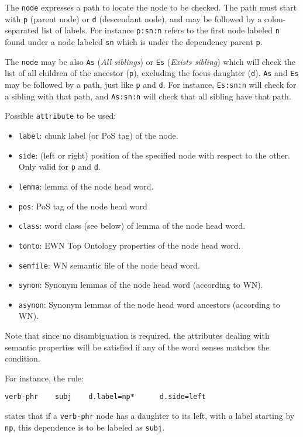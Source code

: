 \documentclass[a4paper]{book}
\begin{document}
   The \verb#node# expresses a path to locate the node to be
   checked. The path must start with \verb#p# (parent node) or
   \verb#d# (descendant node), and may be followed by a
   colon-separated list of labels. For instance \verb#p:sn:n# refers
   to the first node labeled \verb#n# found under a node labeled
   \verb#sn# which is under the dependency parent \verb#p#.

   The \verb#node# may be also \verb#As# ({\em All siblings}) or
   \verb#Es# ({\sl Exists sibling}) which will check the list of all
   children of the ancestor (\verb#p#), excluding the focus daughter
   (\verb#d#).  \verb#As# and \verb#Es# may be followed by a path,
   just like \verb#p# and \verb#d#. For instance, \verb#Es:sn:n# 
   will check for a sibling with that path, and  \verb#As:sn:n# 
   will check that all sibling have that path.
  
   Possible {\tt attribute} to be used:
  \begin{itemize}
    \item \verb#label#: chunk label (or PoS tag) of the node.
    \item \verb#side#: (left or right) position of the specified node with respect to the other.  Only valid for \verb#p# and \verb#d#.
    \item \verb#lemma#: lemma of the node head word.
    \item \verb#pos#: PoS tag of the node head word
    \item \verb#class#: word class (see below) of lemma of the node head word.
    \item \verb#tonto#: EWN Top Ontology properties of the node head word.
    \item \verb#semfile#: WN semantic file of the node head word.
    \item \verb#synon#: Synonym lemmas of the node head word (according to WN).
    \item \verb#asynon#: Synonym lemmas of the node head word ancestors (according to WN).
  \end{itemize}

  Note that since no disambiguation is required, the attributes dealing with semantic properties will be satisfied if any of the word senses matches the condition.

   For instance, the rule:
\begin{verbatim}
verb-phr    subj    d.label=np*      d.side=left
\end{verbatim}
  states that if a \verb#verb-phr# node has a daughter to its left, with a label
  starting by \verb#np#, this dependence is to be labeled as \verb#subj#.
 
\end{document}

